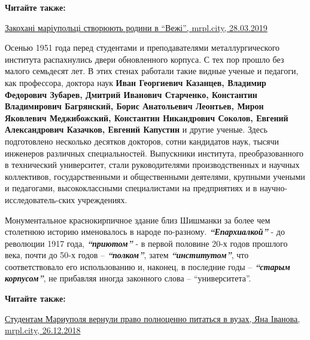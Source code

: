 \textbf{Читайте также:} 

\href{https://mrpl.city/blogs/view/zakohani-mariupoltsi-stvoryuyut-rodini-v-vezhi}{%
Закохані маріупольці створюють родини в \enquote{Вежі}, mrpl.city, 28.03.2019}

Осенью 1951 года перед студентами и преподавателями металлургического института
распахнулись двери обновленного корпуса. С тех пор прошло без малого семьдесят
лет. В этих стенах работали такие видные ученые и педагоги, как профессора,
доктора наук {\bfseries Иван Георгиевич Казанцев, Владимир Федорович Зубарев, Дмитрий
Иванович Старченко, Константин Владимирович Багрянский, Борис Анатольевич
Леонтьев, Мирон Яковлевич Меджибожский, Константин Никандрович Соколов, Евгений
Александрович Казачков, Евгений Капустин} и другие ученые. Здесь подготовлено
несколько десятков докторов, сотни кандидатов наук, тысячи инженеров различных
специальностей. Выпускники института, преобразованного в технический
университет, стали руководителями производственных и научных коллективов,
государственными и общественными деятелями, крупными учеными и педагогами,
высококлассными специалистами на предприятиях и в научно-исследователь\hyp{}ских
учреждениях.

Монументальное краснокирпичное здание близ Шишманки за более чем столетнюю
историю именовалось в народе по-разному. \emph{\bfseries \enquote{Епархиалкой}}
- до революции 1917 года, \emph{\bfseries \enquote{приютом}} - в первой
половине 20-х годов прошлого века, почти до 50-х годов – \emph{\bfseries
\enquote{полком}}, затем \emph{\bfseries\enquote{институтом}}, что
соответствовало его использованию и, наконец, в последние годы –
\emph{\bfseries\enquote{старым корпусом}}, не прибавляя иногда законного слова
– \enquote{университета}.

\textbf{Читайте также:} 

\href{https://mrpl.city/news/view/studentam-mariupolya-vernuli-pravo-polnotsenno-pitatsya-v-vuzah}{%
Студентам Мариуполя вернули право полноценно питаться в вузах, Яна Іванова, mrpl.city, 26.12.2018}
